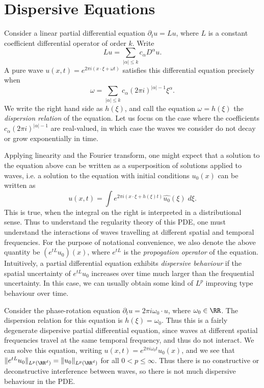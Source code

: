 \chapter{Dispersive Equations}

Consider a linear partial differential equation $\partial_t u = Lu$, where $L$ is a constant coefficient differential operator of order $k$. Write
%
\[ Lu = \sum_{|\alpha| \leq k} c_\alpha D^\alpha u. \]
%
A pure wave $u(x,t) = e^{2 \pi i (x \cdot \xi + \omega t)}$ satisfies this differential equation precisely when
%
\[ \omega = \sum_{|\alpha| \leq k} c_\alpha (2 \pi i)^{|\alpha| - 1} \xi^\alpha. \]
%
We write the right hand side as $h(\xi)$, and call the equation $\omega = h(\xi)$ the \emph{dispersion relation} of the equation. Let us focus on the case where the coefficients $c_\alpha (2 \pi i)^{|\alpha| - 1}$ are real-valued, in which case the waves we consider do not decay or grow exponentially in time.

Applying linearity and the Fourier transform, one might expect that a solution to the equation above can be written as a superposition of solutions applied to waves, i.e. a solution to the equation with initial conditions $u_0(x)$ can be written as
%
\[ u(x,t) = \int e^{2 \pi i (x \cdot \xi + h(\xi) t)} \widehat{u_0}(\xi)\; d\xi. \]
%
This is true, when the integral on the right is interpreted in a distributional sense. Thus to understand the regularity theory of this PDE, one must understand the interactions of waves travelling at different spatial and temporal frequencies. For the purpose of notational convenience, we also denote the above quantity be $(e^{tL} u_0)(x)$, where $e^{tL}$ is the \emph{propogation operator} of the equation. Intuitively, a partial differential equation exhibits \emph{dispersive behaviour} if the spatial uncertainty of $e^{tL} u_0$ increases over time much larger than the frequential uncertainty. In this case, we can usually obtain some kind of $L^p$ improving type behaviour over time.

\begin{example}
    Consider the phase-rotation equation $\partial_t u = 2 \pi i \omega_0 \cdot u$, where $\omega_0 \in \RR$. The dispersion relation for this equation is $h(\xi) = \omega_0$. Thus this is a fairly degenerate dispersive partial differential equation, since waves at different spatial frequencies travel at the same temporal frequency, and thus do not interact. We can solve this equation, writing $u(x,t) = e^{2 \pi i \omega_0 t} u_0(x)$, and we see that $\| e^{tL} u_0 \|_{L^p(\RR^d)} = \| u_0 \|_{L^p(\RR^d)}$ for all $0 < p \leq \infty$. Thus there is no constructive or deconstructive interference between waves, so there is not much dispersive behaviour in the PDE.
\end{example}


